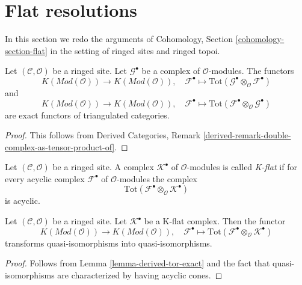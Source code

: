 \section{Flat resolutions}
\label{section-flat}

\noindent
In this section we redo the arguments of
Cohomology, Section \ref{cohomology-section-flat}
in the setting of ringed sites and ringed topoi.

\begin{lemma}
\label{lemma-derived-tor-exact}
Let $(\mathcal{C}, \mathcal{O})$ be a ringed site.
Let $\mathcal{G}^\bullet$ be a complex of $\mathcal{O}$-modules.
The functors
$$
K(\textit{Mod}(\mathcal{O}))
\longrightarrow
K(\textit{Mod}(\mathcal{O})),
\quad
\mathcal{F}^\bullet \longmapsto
\text{Tot}(\mathcal{G}^\bullet \otimes_\mathcal{O} \mathcal{F}^\bullet)
$$
and
$$
K(\textit{Mod}(\mathcal{O}))
\longrightarrow
K(\textit{Mod}(\mathcal{O})),
\quad
\mathcal{F}^\bullet \longmapsto
\text{Tot}(\mathcal{F}^\bullet \otimes_\mathcal{O} \mathcal{G}^\bullet)
$$
are exact functors of triangulated categories.
\end{lemma}

\begin{proof}
This follows from Derived Categories, Remark
\ref{derived-remark-double-complex-as-tensor-product-of}.
\end{proof}

\begin{definition}
\label{definition-K-flat}
Let $(\mathcal{C}, \mathcal{O})$ be a ringed site.
A complex $\mathcal{K}^\bullet$ of $\mathcal{O}$-modules is
called {\it K-flat} if for every acyclic complex $\mathcal{F}^\bullet$
of $\mathcal{O}$-modules the complex
$$
\text{Tot}(\mathcal{F}^\bullet \otimes_\mathcal{O} \mathcal{K}^\bullet)
$$
is acyclic.
\end{definition}

\begin{lemma}
\label{lemma-K-flat-quasi-isomorphism}
Let $(\mathcal{C}, \mathcal{O})$ be a ringed site.
Let $\mathcal{K}^\bullet$ be a K-flat complex.
Then the functor
$$
K(\textit{Mod}(\mathcal{O}))
\longrightarrow
K(\textit{Mod}(\mathcal{O})), \quad
\mathcal{F}^\bullet
\longmapsto
\text{Tot}(\mathcal{F}^\bullet \otimes_\mathcal{O} \mathcal{K}^\bullet)
$$
transforms quasi-isomorphisms into quasi-isomorphisms.
\end{lemma}

\begin{proof}
Follows from
Lemma \ref{lemma-derived-tor-exact}
and the fact that quasi-isomorphisms are characterized by having
acyclic cones.
\end{proof}

